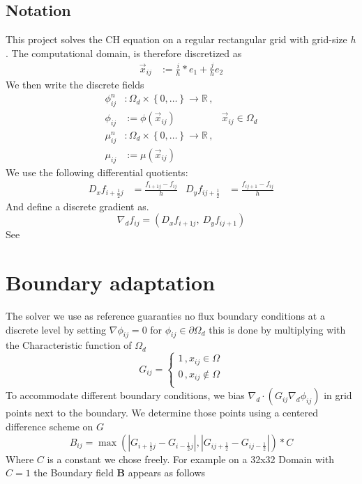 \documentclass{mimosis}
\begin{document}
\section{Notation}
\label{sec:orgc5a0896}
This project solves the CH equation on a regular rectangular grid with grid-size \(h\). The computational domain, is therefore discretized as
\begin{align}
\label{eq:4}
\vec{x}_{ij} &:= \frac{i}{h} * e_{1} + \frac{j}{h} e_2
\end{align}
We then write the discrete fields
\begin{align}
\label{eq:5}
\phi_{ij}^n &: \Omega_d \times \left\{ 0, \dots  \right\} \to \mathbb{R} \,,\\
\phi_{ij} &:= \phi(\vec{x}_{ij}) & \vec{x}_{ij} \in \Omega_{d} \\
\mu_{ij}^n &: \Omega_d \times \left\{ 0, \dots \right\} \to \mathbb{R} \,, \\
\mu_{ij} &:= \mu(\vec{x}_{ij})
\end{align}
We use the following differential quotients:
\begin{align}
D_xf_{i+\frac{1}{2} j} &= \frac{f_{i+1j} - f_{ij}}{h} & D_yf_{ij+\frac{1}{2}} &= \frac{f_{ij+1} - f_{ij}}{h}
\end{align}
And define a discrete gradient as.
\begin{equation}
\nabla_d f_{ij} = (D_x f_{i+1j} , \ D_y f_{ij+1})
\end{equation}
See \autocite{Ulmer_CHRelaxed_2024}
\chapter{Boundary adaptation}
\label{sec:orgb84ef3a}
The solver we use as reference guaranties no flux boundary conditions at a discrete level by setting \(\nabla \phi_{ij} = 0\) for \(\phi_{ij} \in \partial \Omega_{d}\) this is done by multiplying with the Characteristic function of \(\Omega_{d}\)
\begin{equation}
G_{ij}=
\begin{cases}
1 \,, x_{ij} \in \Omega \\
0 \,, x_{ij} \not\in \Omega \\
\end{cases}
\end{equation}
To accommodate different boundary conditions, we bias \(\nabla_d \cdot (G_{ij} \nabla_d \phi_{ij})\) in grid points next to the boundary. We determine those points using a centered difference scheme on \(G\)
\begin{equation}
B_{ij} = \max\left(  |G_{i+\frac{1}{2}j} - G_{i-\frac{1}{2}j}| , |G_{ij+\frac{1}{2}} - G_{ij-\frac{1}{2}}|\right) * C
\end{equation}
Where \(C\) is a constant we chose freely. For example on a 32x32 Domain with \(C=1\) the Boundary field \(\mathbf{B}\) appears as follows
\end{document}
